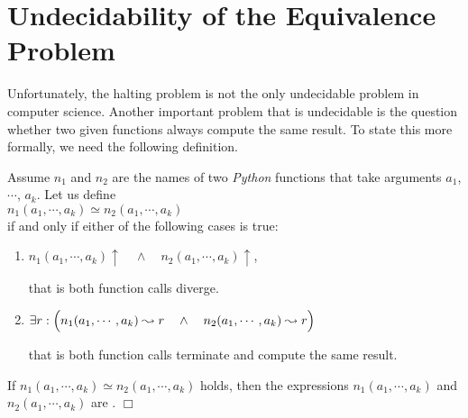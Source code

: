 \section[The Equivalence Problem]{Undecidability of the Equivalence Problem}
Unfortunately, the halting problem is not the only undecidable problem in computer science.  Another
important problem that is undecidable is the question whether two given functions always compute the
same result.  To state this more formally, we need the following definition.


\begin{Definition}[$\simeq$] 
Assume $n_1$ and $n_2$ are the names of two \textsl{Python} functions that take arguments
  $a_1$, $\cdots$, $a_k$.  Let us define \\[0.2cm]
\hspace*{1.3cm} 
$n_1(a_1,\cdots,a_k) \simeq n_2(a_1,\cdots,a_k)$ 
\\[0.2cm]
if and only if either of the following cases is true:
\begin{enumerate}
\item $n_1(a_1,\cdots,a_k)\uparrow \quad\wedge\quad n_2(a_1,\cdots,a_k)\uparrow$,

      that is both function calls diverge.
\item $\exists r: \Bigl(n_1(a_1,\cdots,a_k) \leadsto r \quad\wedge\quad n_2(a_1,\cdots,a_k) \leadsto
  r\Bigr)$

      that is both function calls terminate and compute the same result.
\end{enumerate}
If $n_1(a_1,\cdots,a_k) \simeq n_2(a_1,\cdots,a_k)$ holds, then the expressions $n_1(a_1,\cdots,a_k)$ and $n_2(a_1,\cdots,a_k)$ are 
. 
\hspace*{\fill} $\Box$
\end{Definition}

